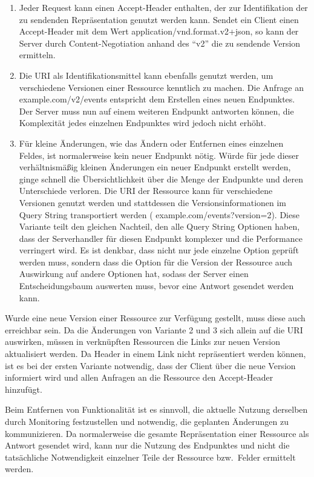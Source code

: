 \begin{enumerate}
  \item Jeder Request kann einen Accept-Header enthalten, der zur Identifikation der zu sendenden Repräsentation genutzt werden kann.
  Sendet ein Client \zB{} einen Accept-Header mit dem Wert application/vnd.format.v2+json, so kann der Server durch Content-Negotiation anhand des \enquote{v2} die zu sendende Version ermitteln.
  \item Die URI als Identifikationsmittel kann ebenfalls genutzt werden, um verschiedene Versionen einer Ressource kenntlich zu machen.
  Die Anfrage an example.com/v2/events entspricht dem Erstellen eines neuen Endpunktes.
  Der Server muss nun auf einem weiteren Endpunkt antworten können, die Komplexität jedes einzelnen Endpunktes wird jedoch nicht erhöht.
  \item Für kleine Änderungen, wie das Ändern oder Entfernen eines einzelnen Feldes, ist normalerweise kein neuer Endpunkt nötig.
  Würde für jede dieser verhältnismäßig kleinen Änderungen ein neuer Endpunkt erstellt werden, ginge schnell die Übersichtlichkeit über die Menge der Endpunkte und deren Unterschiede verloren.
  Die URI der Ressource kann für verschiedene Versionen genutzt werden und stattdessen die Versionsinformationen im Query String transportiert werden (\zB{} example.com/events?version=2).
  Diese Variante teilt den gleichen Nachteil, den alle Query String Optionen haben, dass der Serverhandler für diesen Endpunkt komplexer und die Performance verringert wird.
  Es ist denkbar, dass nicht nur jede einzelne Option geprüft werden muss, sondern dass die Option für die Version der Ressource auch Auswirkung auf andere Optionen hat, sodass der Server einen Entscheidungsbaum auswerten muss, bevor eine Antwort gesendet werden kann.
\end{enumerate}
Wurde eine neue Version einer Ressource zur Verfügung gestellt, muss diese auch erreichbar sein.
Da die Änderungen von Variante 2 und 3 sich allein auf die URI auswirken, müssen in verknüpften Ressourcen die Links zur neuen Version aktualisiert werden.
Da Header in einem Link nicht repräsentiert werden können, ist es bei der ersten Variante notwendig, dass der Client über die neue Version informiert wird und allen Anfragen an die Ressource den Accept-Header hinzufügt.
\par
Beim Entfernen von Funktionalität ist es sinnvoll, die aktuelle Nutzung derselben durch Monitoring festzustellen und notwendig, die geplanten Änderungen zu kommunizieren.
Da normalerweise die gesamte Repräsentation einer Ressource als Antwort gesendet wird, kann nur die Nutzung des Endpunktes und nicht die tatsächliche Notwendigkeit einzelner Teile der Ressource bzw.\ Felder ermittelt werden.
